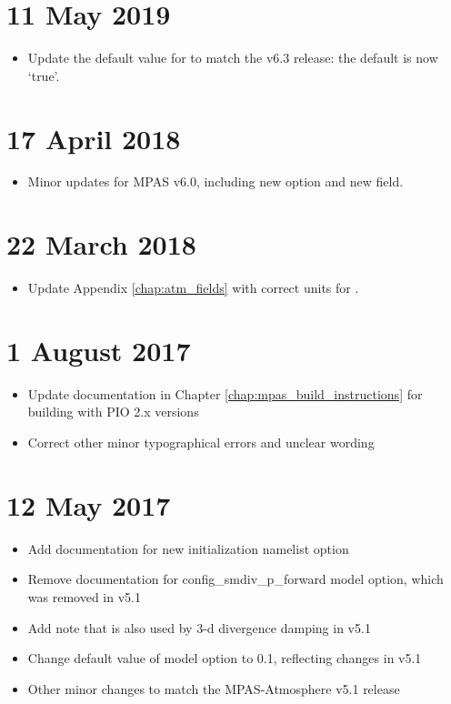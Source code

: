 \section*{11 May 2019}

\begin{itemize}
\item Update the default value for  to match the v6.3 release: the default is now `true'.
\end{itemize}

\section*{17 April 2018}

\begin{itemize}
\item Minor updates for MPAS v6.0, including new  option and new  field.
\end{itemize}

\section*{22 March 2018}

\begin{itemize}
\item Update Appendix \ref{chap:atm_fields} with correct units for .
\end{itemize}

\section*{1 August 2017}

\begin{itemize}
\item Update documentation in Chapter \ref{chap:mpas_build_instructions} for building with PIO 2.x versions
\item Correct other minor typographical errors and unclear wording
\end{itemize}

\section*{12 May 2017}

\begin{itemize}
\item Add documentation for new  initialization namelist option
\item Remove documentation for config\_smdiv\_p\_forward model option, which was removed in v5.1
\item Add note that  is also used by 3-d divergence damping in v5.1
\item Change default value of  model option to 0.1, reflecting changes in v5.1
\item Other minor changes to match the MPAS-Atmosphere v5.1 release
\end{itemize}

